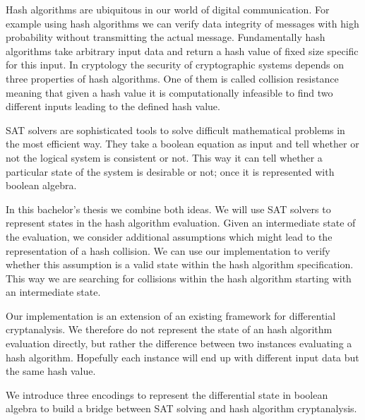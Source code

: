 Hash algorithms are ubiquitous in our world of digital communication.
For example using hash algorithms we can verify data integrity of messages
with high probability without transmitting the actual message. Fundamentally
hash algorithms take arbitrary input data and return a hash value of fixed
size specific for this input. In cryptology the security of cryptographic
systems depends on three properties of hash algorithms. One of them is called
collision resistance meaning that given a hash value it is computationally
infeasible to find two different inputs leading to the defined hash value.

SAT solvers are sophisticated tools to solve difficult mathematical problems
in the most efficient way. They take a boolean equation as input and tell
whether or not the logical system is consistent or not. This way it can tell
whether a particular state of the system is desirable or not; once it is
represented with boolean algebra.

In this bachelor's thesis we combine both ideas. We will use SAT solvers to
represent states in the hash algorithm evaluation. Given an intermediate
state of the evaluation, we consider additional assumptions which might
lead to the representation of a hash collision. We can use our implementation
to verify whether this assumption is a valid state within the hash algorithm
specification. This way we are searching for collisions within the hash
algorithm starting with an intermediate state.

Our implementation is an extension of an existing framework for differential
cryptanalysis. We therefore do not represent the state of an hash algorithm
evaluation directly, but rather the difference between two instances evaluating
a hash algorithm. Hopefully each instance will end up with different input data
but the same hash value.

We introduce three encodings to represent the differential state in boolean
algebra to build a bridge between SAT solving and hash algorithm cryptanalysis.
